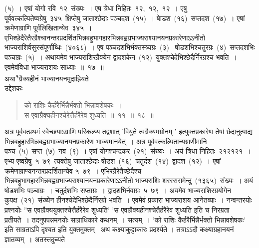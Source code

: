 \documentclass[11pt, openany]{book}
\begin{document}
\newpage
\thispagestyle{fancy}
\fancyhf{}
\noindent
(५)~। एषां योगो रवि~१२~संख्यः~। एष त्रेधा निहितः~१२,~१२,~१२~। एषु पूर्ववत्कल्पितेष्वग्रेषु~३\textendash४\textendash५~क्षिप्तेषु जाताश्छेदाः पञ्चदश~(१५)~। षाेडश~(१६)~सप्तदश~(१७)~। एषां क्रमेणाग्राणि पूर्वलिखितान्येव~३\textendash४\textendash५~।एभिश्छेदैरेतैरग्रैश्चानन्तरप्रदर्शितभिन्नबहुभागहारभिन्नबह्वग्रभाज्यराश्यानयनप्रकारेणाऽऽनीतो भाज्यराशिर्वसुरसंपूर्णाब्धिः~(४०६८)~। एष पञ्चदशभिर्भक्तस्त्र्यग्रः~(३)~ षोडशभिश्चतुरग्रः~(४)~सप्तदशभिः पञ्चाग्रः~(५)~। अथायमेव भाज्यराशिरग्रैक्येन द्वादशकेन~(१२)~युक्तश्चेदेभिश्छेदैर्निरग्रश्च भवति~। एवमेवंविधा भाज्यराशयः साध्याः~॥~१७~॥\\
\indent
अथा\textsuperscript{१}ग्रैक्यहीनं भाज्यानयनमुदाह्रियते\textendash\\
उद्देशकः\textendash
\begin{quote}
{\ku को राशिः कैर्हरैर्भिन्नैर्भक्तो भिन्नावशेषकः~।\\
स एवाग्रैक्यहीनश्चेरेत्तैर्हरैरेव शुध्यति~॥~११~॥~१८~॥}
\end{quote}

\indent
अत्र पूर्ववत्प्रथमं स्वेच्छयाऽग्राणि परिकल्प्य तद्वशात् 'वियुते त्वग्रैक्यमग्रोनम् ' इत्युक्तप्रकारेण तेषां छेदानुत्पाद्य भिन्नबहुहारभिन्नबह्वग्रभाज्यानयनप्रकारेण भाज्यमानयेत्~। अत्र पूर्ववत्कल्पितान्यग्राणीमानि पञ्च~(५)~सप्त~(७)~नव~(९)~। एषां योगश्चन्द्रकर~(२१)~संख्यः~। अयं त्रिधा निहितः~२१\textendash २१\textendash २१~। एभ्य एष्वग्रेषु~५\textendash\ ७\textendash९~त्यक्तेषु जाताश्छेदाः षोडश~(१६)~चतुर्दश~(१४)~द्वादश~(१२)~। एषां क्रमेणाग्राण्यनन्तरप्रदर्शितान्येव ५\textendash\ ७\textendash ९~। एभिरग्रैरेतैच्छेदैश्च भिन्नबहुभागहारभिन्नबह्वग्रभाज्यराश्यानयनप्रकारेणाऽऽनीतो भाज्यराशिः शररसरामेन्दु~(१३६५)~संख्यः~। अयं षोडशभिः पञ्चाग्रः~। चतुर्दशभिः सप्ताग्रः~। द्वादशभिर्नवाग्रः~५\textendash\ ७\textendash९~। अयमेव भाज्यराशिरग्रयोगेन कुपक्ष~(२१)~संख्येन हीनश्चेदेभिश्छेदैर्निरग्रो भवति~। एवमेवं प्रकारा भाज्यराशय आनेतव्याः~। नन्वन्तरयोः प्रश्नयोः ''स एवाग्रैक्ययुक्तश्चेत्तैर्हरैरेव शुध्यति' 'स एवाग्रैक्यहीनश्चेतैर्हरैरेव शुध्यति इति च निरग्रता प्रतीयते~। तदनुपपन्नमनयोः
साग्राधिकारे कथनम्~। सत्यम्~। 'को राशिः कैर्हरैर्भिन्नैर्भक्तो भिन्नावशेषकः' इति साग्रताऽपि दृश्यत इति युक्तमुक्तम् \textendash\ अथ कक्ष्याकुट्टाकारः प्रदर्श्यते ।
तत्राऽऽदौ कक्ष्याग्रहानयनं ज्ञातव्यम्~। अतस्तदुच्यते\textendash

\end{document}
